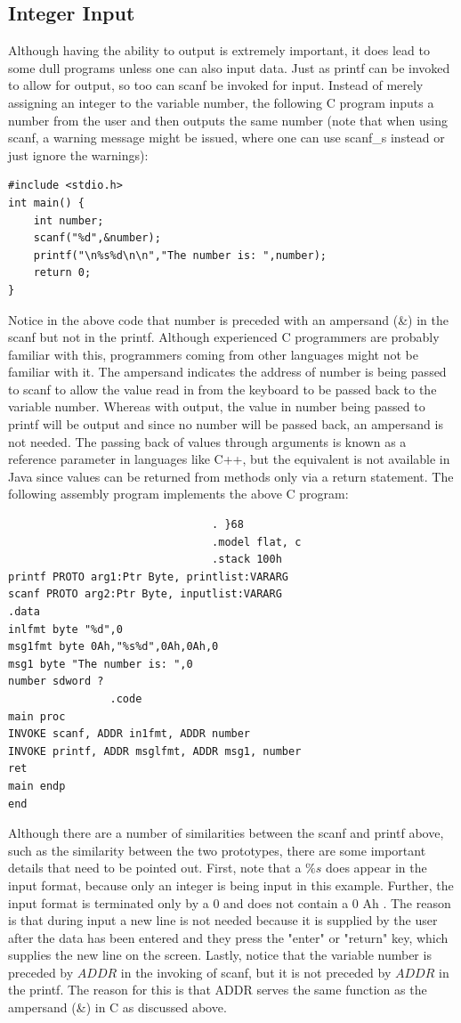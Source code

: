 \documentclass[10pt]{book}
\begin{document}
\subsection{Integer Input}
Although having the ability to output is extremely important, it does lead to some dull programs unless one can also input data. Just as printf can be invoked to allow for output, so too can scanf be invoked for input. Instead of merely assigning an integer to the variable number, the following C program inputs a number from the user and then outputs the same number (note that when using scanf, a warning message might be issued, where one can use scanf\_s instead or just ignore the warnings):
\begin{verbatim}
#include <stdio.h>
int main() {
    int number;
    scanf("%d",&number);
    printf("\n%s%d\n\n","The number is: ",number);
    return 0;
}
\end{verbatim}

Notice in the above code that number is preceded with an ampersand (\&) in the scanf but not in the printf. Although experienced C programmers are probably familiar with this, programmers coming from other languages might not be familiar with it. The ampersand indicates the address of number is being passed to scanf to allow the value read in from the keyboard to be passed back to the variable number. Whereas with output, the value in number being passed to printf will be output and since no number will be passed back, an ampersand is not needed. The passing back of values through arguments is known as a reference parameter in languages like C++, but the equivalent is not available in Java since values can be returned from methods only via a return statement. The following assembly program implements the above C program:

\begin{verbatim}
                                . }68
                                .model flat, c
                                .stack 100h
printf PROTO arg1:Ptr Byte, printlist:VARARG
scanf PROTO arg2:Ptr Byte, inputlist:VARARG
.data
inlfmt byte "%d",0
msg1fmt byte 0Ah,"%s%d",0Ah,0Ah,0
msg1 byte "The number is: ",0
number sdword ?
                .code
main proc
INVOKE scanf, ADDR in1fmt, ADDR number
INVOKE printf, ADDR msglfmt, ADDR msg1, number
ret
main endp
end
\end{verbatim}

Although there are a number of similarities between the scanf and printf above, such as the similarity between the two prototypes, there are some important details that need to be pointed out. First, note that a $\% s$ does appear in the input format, because only an integer is being input in this example. Further, the input format is terminated only by a 0 and does not contain a 0 Ah . The reason is that during input a new line is not needed because it is supplied by the user after the data has been entered and they press the "enter" or "return" key, which supplies the new line on the screen. Lastly, notice that the variable number is preceded by $A D D R$ in the invoking of scanf, but it is not preceded by $A D D R$ in the printf. The reason for this is that ADDR serves the same function as the ampersand (\&) in C as discussed above.
\end{document}
